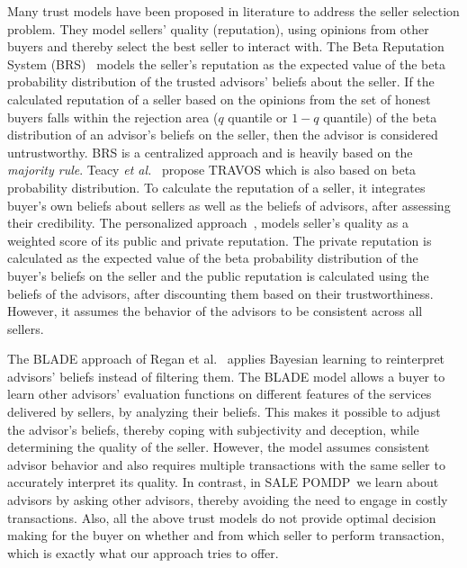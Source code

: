 \documentclass{aamas2013}
\providecommand{\SALEP}{SALE POMDP}
\begin{document}
Many trust models have been proposed in literature to address the seller selection problem. They model sellers' quality (reputation), using opinions from other buyers and thereby select the best seller to interact with. The Beta Reputation System (BRS)~\cite{whitby05} models the seller's reputation as the expected value of the beta probability distribution of the trusted advisors' beliefs about the seller. If the calculated reputation of a seller based on the opinions from the set of honest buyers falls within the rejection area ($q$ quantile or $1-q$ quantile) of the beta distribution of an advisor's beliefs on the seller, then the advisor is considered untrustworthy. BRS is a centralized approach and is heavily based on the \textit{majority rule}. Teacy \emph{et al.}~\cite{teach06} propose TRAVOS which is also based on beta probability distribution. To calculate the reputation of a seller, it integrates buyer's own beliefs about sellers as well as the beliefs of advisors, after assessing their credibility. The personalized approach~\cite{zhang08}, models seller's quality as a weighted score of its public and private reputation. The private reputation is calculated as the expected value of the beta probability distribution of the buyer's beliefs on the seller and the public reputation is calculated using the beliefs of the advisors, after discounting them based on their trustworthiness. However, it assumes the behavior of the advisors to be consistent across all sellers.

The BLADE approach of Regan et al.~\cite{regan2006bayesian} applies Bayesian learning to reinterpret advisors' beliefs instead of filtering them. The BLADE model allows a buyer to learn other advisors' evaluation functions on different features of the services delivered by sellers, by analyzing their beliefs. This makes it possible to adjust the advisor's beliefs, thereby coping with subjectivity and deception, while determining the quality of the seller. However, the model assumes consistent advisor behavior and also requires multiple transactions with the same seller to accurately interpret its quality. In contrast, in \SALEP\ we learn about advisors by asking other advisors, thereby avoiding the need to engage in costly transactions. Also, all the above trust models do not provide optimal decision making for the buyer on whether and from which seller to perform transaction, which is exactly what our approach tries to offer.
\end{document}
